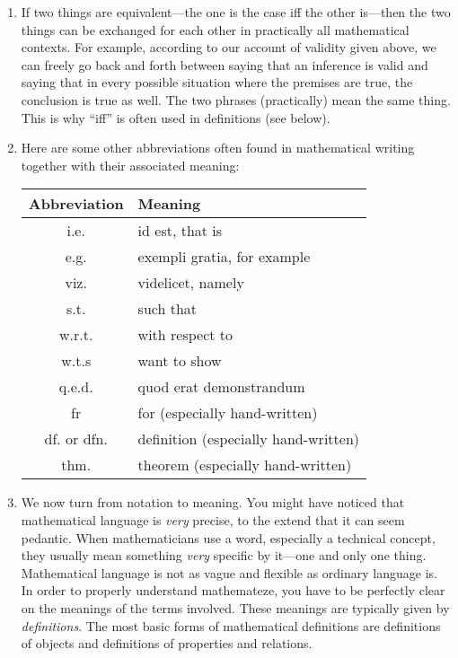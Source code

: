 \begin{enumerate}[{\thesection}.1]
	\item If two things are equivalent---the one is the case iff the other is---then the two things can be exchanged for each other in practically all mathematical contexts. For example, according to our account of validity given above, we can freely go back and forth between saying that an inference is valid and saying that in every possible situation where the premises are true, the conclusion is true as well. The two phrases (practically) mean the same thing. This is why ``iff'' is often used in definitions (see below). 
	
	\item Here are some other abbreviations often found in mathematical writing together with their associated meaning:
	
		\begin{longtable}{c | l}
			Abbreviation & Meaning\\\hline
			
			i.e. & id est, that is\\
			e.g. & exempli gratia, for example\\
			viz. & videlicet, namely\\
			s.t. & such that\\
			w.r.t. & with respect to\\
			w.t.s & want to show\\
			q.e.d. & quod erat demonstrandum\\
			fr & for (especially hand-written)\\
			df. or dfn. & definition (especially hand-written)\\
			thm. & theorem (especially hand-written)\\
			
			\end{longtable}
				
		\item We now turn from notation to meaning. You might have noticed that mathematical language is \emph{very} precise, to the extend that it can seem pedantic. When mathematicians use a word, especially a technical concept, they usually mean something \emph{very} specific by it---one and only one thing. Mathematical language is not as vague and flexible as ordinary language is. In order to properly understand mathemateze, you have to be perfectly clear on the meanings of the terms involved. These meanings are typically given by \emph{definitions}. The most basic forms of mathematical definitions are definitions of objects and definitions of properties and relations.
		

\end{enumerate}
